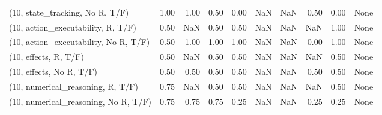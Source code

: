\begin{table*}[h!]
\begin{adjustbox}{width=2\columnwidth,center}
\begin{tabular}{lrrr|rrr|rrr}
(10, state\_tracking, No R, T/F)       &                      1.00 &                  1.00 &                      0.50 &                          0.00 &                       NaN &                           NaN &                                   0.50 &                               0.00 &                                  None \\
(10, action\_executability, R, T/F)    &                      0.50 &                   NaN &                      0.50 &                          0.50 &                       NaN &                           NaN &                                    NaN &                               1.00 &                                  None \\
(10, action\_executability, No R, T/F) &                      0.50 &                  1.00 &                      1.00 &                          1.00 &                       NaN &                           NaN &                                   0.00 &                               1.00 &                                  None \\
(10, effects, R, T/F)                 &                      0.50 &                   NaN &                      0.50 &                          0.50 &                       NaN &                           NaN &                                    NaN &                               0.50 &                                  None \\
(10, effects, No R, T/F)              &                      0.50 &                  0.50 &                      0.50 &                          0.50 &                       NaN &                           NaN &                                   0.50 &                               0.50 &                                  None \\
(10, numerical\_reasoning, R, T/F)     &                      0.75 &                   NaN &                      0.50 &                          0.50 &                       NaN &                           NaN &                                    NaN &                               0.50 &                                  None \\
(10, numerical\_reasoning, No R, T/F)  &                      0.75 &                  0.75 &                      0.75 &                          0.25 &                       NaN &                           NaN &                                   0.25 &                               0.25 &                                  None \\

\end{tabular}
\end{adjustbox}
\end{table*}
